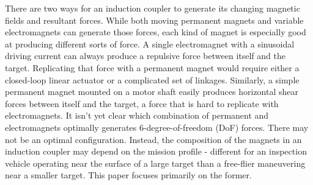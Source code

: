 There are two ways for an induction coupler to generate its changing magnetic fields and resultant forces. While both moving permanent magnets and variable electromagnets can generate those forces, each kind of magnet is especially good at producing different sorts of force. A single electromagnet with a sinusoidal driving current can always produce a repulsive force between itself and the target. Replicating that force with a permanent magnet would require either a closed-loop linear actuator or a complicated set of linkages. Similarly, a simple permanent magnet mounted on a motor shaft easily produces horizontal shear forces between itself and the target, a force that is hard to replicate with electromagnets. It isn't yet clear which combination of permanent and electromagnets optimally generates 6-degree-of-freedom (DoF) forces. There may not be an optimal configuration. Instead, the composition of the magnets in an induction coupler may depend on the mission profile - different for an inspection vehicle operating near the surface of a large target than a free-flier maneuvering near a smaller target. This paper focuses primarily on the former.

%